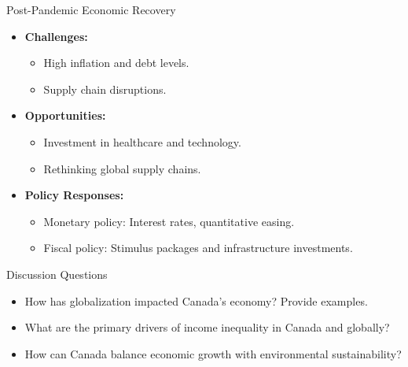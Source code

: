 \documentclass{beamer}
\begin{document}

\begin{frame}{Post-Pandemic Economic Recovery}
  \begin{itemize}
    \item \textbf{Challenges:}
      \begin{itemize}
        \item High inflation and debt levels.
        \item Supply chain disruptions.
      \end{itemize}
    \item \textbf{Opportunities:}
      \begin{itemize}
        \item Investment in healthcare and technology.
        \item Rethinking global supply chains.
      \end{itemize}
    \item \textbf{Policy Responses:}
      \begin{itemize}
        \item Monetary policy: Interest rates, quantitative easing.
        \item Fiscal policy: Stimulus packages and infrastructure investments.
      \end{itemize}
  \end{itemize}
\end{frame}


\begin{frame}{Discussion Questions}
  \begin{itemize}
    \item How has globalization impacted Canada’s economy? Provide examples.
    \item What are the primary drivers of income inequality in Canada and globally?
    \item How can Canada balance economic growth with environmental sustainability?
  \end{itemize}
\end{frame}
\end{document}
